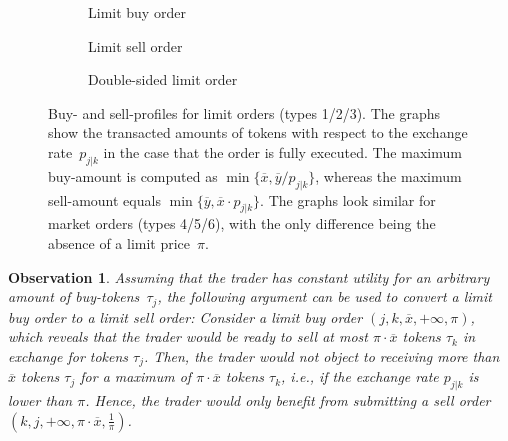 \documentclass[11pt,parskip=full]{scrartcl}%
\newcommand*{\ie}{i.e., }
\newtheorem{observation}[theorem]{Observation}
\begin{document}
\begin{figure}
  \begin{subfigure}{0.45\textwidth}
    
    \caption{Limit buy order}
  \end{subfigure}
  \hfill
  \begin{subfigure}{0.45\textwidth}
    
    \caption{Limit sell order}
  \end{subfigure}

  \vspace{.8cm}
  \begin{subfigure}{0.45\textwidth}
    
    \caption{Double-sided limit order}
  \end{subfigure}
  \hfill
  \begin{subfigure}{0.45\textwidth}
  \end{subfigure}
  \caption{
    Buy- and sell-profiles for limit orders (types 1/2/3).
    The graphs show the transacted amounts of tokens with respect to the exchange rate~$p_{j|k}$
    in the case that the order is fully executed.
    The maximum buy-amount is computed as $\min\{\overline{x},\overline{y}/p_{j|k}\}$, whereas the
    maximum sell-amount equals $\min\{\overline{y},\overline{x} \cdot p_{j|k}\}$.
    The graphs look similar for market orders (types 4/5/6), with the only difference being the
    absence of a limit price~$\pi$.}
  \label{fig:buy_sell_demand}
\end{figure}

\vspace{.3cm}
\begin{observation}
  Assuming that the trader has constant utility for an arbitrary amount of buy-tokens~$\tau_j$,
  the following argument can be used to convert a limit buy order to a limit sell order:
  Consider a limit buy order $ (j,k,\overline{x},+\infty,\pi) $, which reveals that the trader
  would be ready to sell at most $ \pi \cdot \overline{x} $ tokens $ \tau_k $ in exchange for
  tokens $ \tau_j $.
  Then, the trader would not object to receiving more than $ \overline{x} $ tokens $ \tau_j $ for a
  maximum of $ \pi \cdot \overline{x} $ tokens $ \tau_k $, \ie if the exchange rate $ p_{j|k} $ is
  lower than $ \pi $.
  Hence, the trader would only benefit from submitting a sell order
  $ (k,j,+\infty,\pi \cdot \overline{x},\frac{1}{\pi}) $.
\end{observation}
\end{document}

